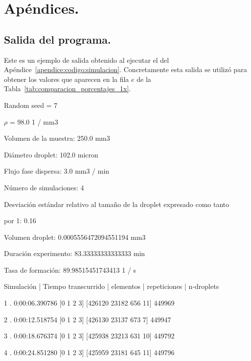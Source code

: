 \section{Apéndices.}\label{apendice:tb_codigo}

\subsection{Salida del programa.}\label{apendice:salida}

Este es un ejemplo de salida obtenido al ejecutar el  del Apéndice~\ref{apendice:codigo:simulacion}. Concretamente esta salida se utilizó para obtener los valores que aparecen en la fila $e$ de la Tabla~\ref{tab:comparacion_porcentajes_1x}.

{\selectfont

\small{

\vspace{5mm}
Random seed =  7

$\rho$ =  98.0 1 / mm3 

Volumen de la muestra:  250.0 mm3 

Diámetro droplet:  102.0 micron 

Flujo fase dispersa:  3.0 mm3 / min 

Número de simulaciones:  4 

Desviación estándar relativo al tamaño de la droplet expresado como tanto 

por 1: 0.16 

\vspace{5mm}

Volumen droplet:  0.0005556472094551194 mm3 

Duración experimento:  83.33333333333333 min 

Tasa de formación:  89.98515451743413 1 / s 

\vspace{5mm}

Simulación | Tiempo transcurrido | elementos | repeticiones | n-droplets

1 .  0:00:06.390786 [0 1 2 3] [426120  23182    656     11] 449969

2 .  0:00:12.518754 [0 1 2 3] [426130  23137    673      7] 449947

3 .  0:00:18.676374 [0 1 2 3] [425938  23213    631     10] 449792

4 .  0:00:24.851280 [0 1 2 3] [425959  23181    645     11] 449796

\vspace{5mm}

}}
